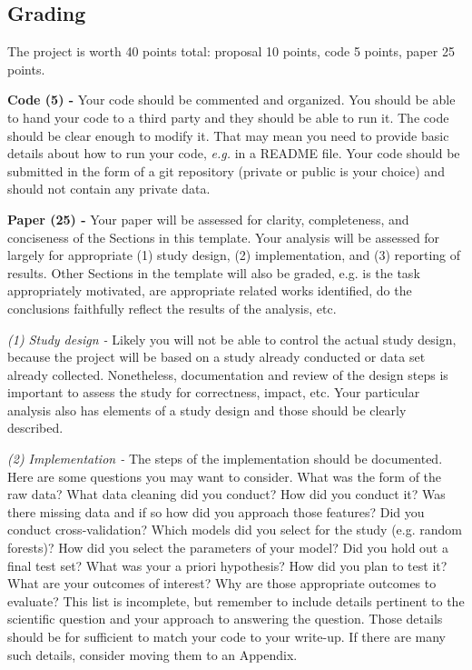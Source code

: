 \documentclass[twoside,11pt]{article}
\begin{document}
\subsection{Grading}
The project is worth 40 points total: proposal 10 points, code 5 points, paper 25 points.

\vspace{0.5em}
\textbf{Code (5) -} Your code should be commented and organized. You should be able to hand your code to a third party and they should be able to run it. The code should be clear enough to modify it. That may mean you need to provide basic details about how to run your code, \emph{e.g.} in a README file. Your code should be submitted in the form of a git repository (private or public is your choice) and should not contain any private data. 

\vspace{0.5em}
\textbf{Paper (25) -} Your paper will be assessed for clarity, completeness, and conciseness of the Sections in this template. Your analysis will be assessed for largely for appropriate (1) study design, (2) implementation, and (3) reporting of results. Other Sections in the template will also be graded, e.g. is the task appropriately motivated, are appropriate related works identified, do the conclusions faithfully reflect the results of the analysis, etc.

\emph{(1) Study design -} Likely you will not be able to control the actual study design, because the project will be based on a study already conducted or data set already collected. Nonetheless, documentation and review of the design steps is important to assess the study for correctness, impact, etc. Your particular analysis also has elements of a study design and those should be clearly described.

\emph{(2) Implementation -} The steps of the implementation should be documented. Here are some questions you may want to consider. What was the form of the raw data? What data cleaning did you conduct? How did you conduct it? Was there missing data and if so how did you approach those features? Did you conduct cross-validation? Which models did you select for the study (e.g. random forests)? How did you select the parameters of your model? Did you hold out a final test set? What was your a priori hypothesis? How did you plan to test it? What are your outcomes of interest? Why are those appropriate outcomes to evaluate? This list is incomplete, but remember to include details pertinent to the scientific question and your approach to answering the question. Those details should be for sufficient to match your code to your write-up. If there are many such details, consider moving them to an Appendix.
\end{document}
